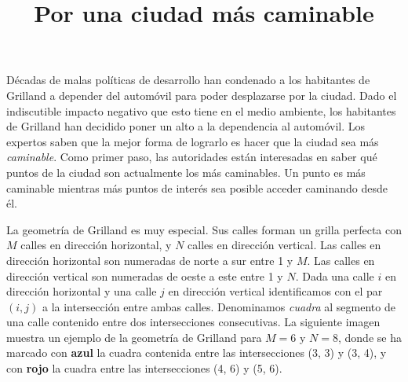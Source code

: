 \documentclass{oci}
\title{Por una ciudad más caminable}
\begin{document}
\begin{problemDescription}
  Décadas de malas políticas de desarrollo han condenado a los habitantes de Grilland a depender
  del automóvil para poder desplazarse por la ciudad.
  Dado el indiscutible impacto negativo que esto tiene en el medio ambiente, los habitantes de
  Grilland han decidido poner un alto a la dependencia al automóvil.
  Los expertos saben que la mejor forma de lograrlo es hacer que la ciudad sea más
  \emph{caminable}.
  Como primer paso, las autoridades están interesadas en saber qué puntos de la ciudad son
  actualmente los más caminables.
  Un punto es más caminable mientras más puntos de interés sea posible acceder caminando
  desde él.

  La geometría de Grilland es muy especial.
  Sus calles forman un grilla perfecta con $M$ calles en dirección horizontal,
  y $N$ calles en dirección vertical.
  Las calles en dirección horizontal son numeradas de norte a sur entre 1 y $M$.
  Las calles en dirección vertical son numeradas de oeste a este entre 1 y $N$.
  Dada una calle $i$ en dirección horizontal y una calle $j$ en dirección vertical identificamos
  con el par $(i, j)$ a la intersección entre ambas calles.
  Denominamos \emph{cuadra} al segmento de una calle contenido entre dos intersecciones consecutivas.
  La siguiente imagen muestra un ejemplo de la geometría de Grilland para $M=6$ y $N=8$, donde se
  ha marcado con {\bf\color{blue}azul} la cuadra contenida entre las intersecciones (3, 3) y (3, 4),
   y con {\bf\color{red}rojo} la cuadra entre las intersecciones (4, 6) y (5, 6).


  \begin{center}
  \end{center}


\end{problemDescription}
\end{document}
